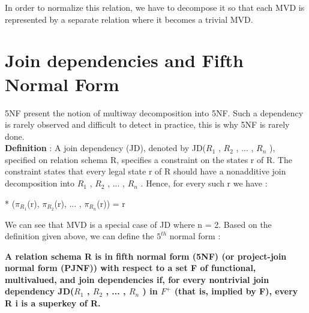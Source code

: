 In order to normalize this relation, we have to decompose it so that each MVD is represented by a separate relation where it becomes a trivial MVD.


\section{Join dependencies and Fifth Normal Form}
5NF present the notion of multiway decomposition into 5NF. Such a dependency is rarely observed and difficult to detect in practice, this is why 5NF is rarely done.\\

\textbf{Definition} : A join dependency (JD), denoted by JD($R_1$ , $R_2$ , ... , $R_n$ ), specified on relation schema R, specifies a constraint on the states r of R. The constraint states that every legal state r of R should have a nonadditive join decomposition into $R_1$ , $R_2$ , ... , $R_n$ . Hence, for every such r we have :
\begin{center}
* ($\pi _{R_1} $(r), $\pi _{R_2} $(r), ... , $\pi _{R_n} $(r)) = r
\end{center}

We can see that MVD is a special case of JD where n = 2. Based on the definition given above, we can define the $5^{th}$ normal form :
\begin{center}
\textbf{A relation schema R is in fifth normal form (5NF) (or project-join normal form (PJNF)) with respect to a set F of functional, multivalued, and join dependencies if, for every nontrivial join dependency JD($R_1$ , $R_2$ , ... , $R_n$ ) in $F^+$ (that is, implied by F), every R i is a superkey of R.}
\end{center}



